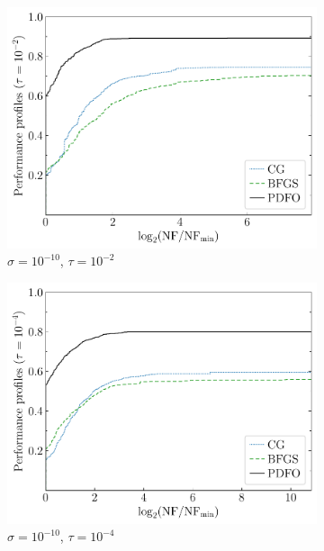 \documentclass[
    smallextended,  %
    final,          %
]{svjour3}
\begin{document}
\begin{figure}[htbp]
\begin{subfigure}{.48\textwidth}
        \centering
        \includegraphics[width=\textwidth]{perf-noisy-bfgs_cg_pdfo-50-10-2.pdf}
        \caption{$\sigma = 10^{-10}$, $\tau = 10^{-2}$}
    \end{subfigure}
    \hfill
    \begin{subfigure}{.48\textwidth}
        \centering
        \includegraphics[width=\textwidth]{perf-noisy-bfgs_cg_pdfo-50-10-4.pdf}
        \caption{$\sigma = 10^{-10}$, $\tau = 10^{-4}$}
    \end{subfigure}
    \hfill
    \begin{subfigure}{.48\textwidth}
        \centering

\end{subfigure}
\end{figure}
\end{document}

